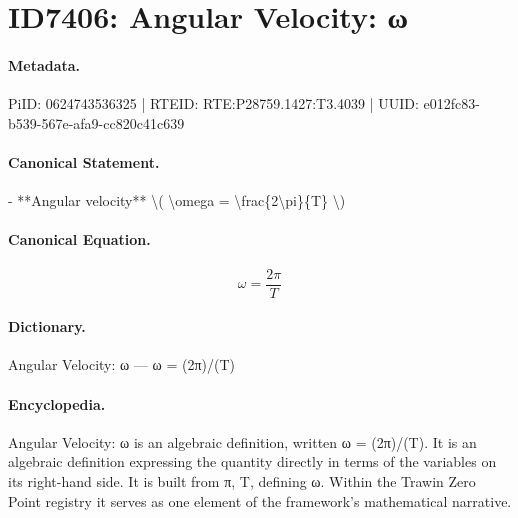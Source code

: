 \section*{ID7406: Angular Velocity: ω}
\paragraph{Metadata.}
PiID: 0624743536325 | RTEID: RTE:P28759.1427:T3.4039 | UUID: e012fc83-b539-567e-afa9-cc820c41c639

\paragraph{Canonical Statement.}
- **Angular velocity** \textbackslash{}( \textbackslash{}omega = \textbackslash{}frac\{2\textbackslash{}pi\}\{T\} \textbackslash{})

\paragraph{Canonical Equation.}
\[
\omega = \frac{2\pi}{T}
\]

\paragraph{Dictionary.}
Angular Velocity: ω — ω = (2π)/(T)

\paragraph{Encyclopedia.}
Angular Velocity: ω is an algebraic definition, written ω = (2π)/(T). It is an algebraic definition expressing the quantity directly in terms of the variables on its right-hand side. It is built from π, T, defining ω. Within the Trawin Zero Point registry it serves as one element of the framework's mathematical narrative.
